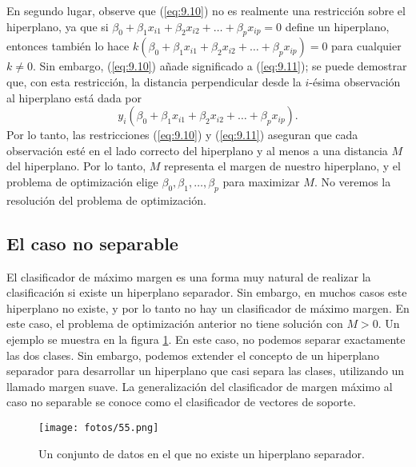 En segundo lugar, observe que (\ref{eq:9.10}) no es realmente una restricción sobre el hiperplano, ya que si $\beta_0 + \beta_1 x_{i1} + \beta_2 x_{i2} + \ldots + \beta_p x_{ip} = 0$ define un hiperplano, entonces también lo hace $k (\beta_0 + \beta_1 x_{i1} + \beta_2 x_{i2} + \ldots + \beta_p x_{ip}) = 0$ para cualquier $k \neq 0$. Sin embargo, (\ref{eq:9.10}) añade significado a (\ref{eq:9.11}); se puede demostrar que, con esta restricción, la distancia perpendicular desde la $i$-ésima observación al hiperplano está dada por
\begin{equation}
y_i (\beta_0 + \beta_1 x_{i1} + \beta_2 x_{i2} + \ldots + \beta_p x_{ip}).
\end{equation}
Por lo tanto, las restricciones (\ref{eq:9.10}) y (\ref{eq:9.11}) aseguran que cada observación esté en el lado correcto del hiperplano y al menos a una distancia $M$ del hiperplano. Por lo tanto, $M$ representa el margen de nuestro hiperplano, y el problema de optimización elige $\beta_0, \beta_1, \ldots, \beta_p$ para maximizar $M$. No veremos la resolución del problema de optimización.


\subsection{El caso no separable}

El clasificador de máximo margen es una forma muy natural de realizar la clasificación si existe un hiperplano separador. Sin embargo, en muchos casos este hiperplano no existe, y por lo tanto no hay un clasificador de máximo margen. En este caso, el problema de optimización anterior no tiene solución con $M > 0$. Un ejemplo se muestra en la figura \ref{fig:9.4}. En este caso, no podemos separar exactamente las dos clases. Sin embargo, podemos extender el concepto de un hiperplano separador para desarrollar un hiperplano que casi separa las clases, utilizando un llamado margen suave. La generalización del clasificador de margen máximo al caso no separable se conoce como el clasificador de vectores de soporte.

\begin{figure}[h]
\centering
\texttt{[image: fotos/55.png]}
\caption{Un conjunto de datos en el que no existe un hiperplano separador.}
\label{fig:9.4}
\end{figure}